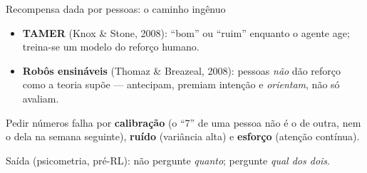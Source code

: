 \documentclass[aspectratio=169, 11pt]{beamer}
\begin{document}
\begin{frame}{Recompensa dada por pessoas: o caminho ingênuo}

  \begin{itemize}\setlength{\itemsep}{0.35ex}
    \item \textbf{TAMER} (Knox \& Stone, 2008): ``bom'' ou ``ruim'' enquanto o
      agente age; treina-se um modelo do reforço humano.
    \item \textbf{Robôs ensináveis} (Thomaz \& Breazeal, 2008): pessoas
      \emph{não} dão reforço como a teoria supõe --- antecipam, premiam
      intenção e \emph{orientam}, não só avaliam.
  \end{itemize}

  \begin{alertabox}
    Pedir números falha por \textbf{calibração} (o ``7'' de uma pessoa não é o
    de outra, nem o dela na semana seguinte), \textbf{ruído} (variância alta) e
    \textbf{esforço} (atenção contínua).
  \end{alertabox}

  \begin{ideiabox}
    Saída (psicometria, pré-RL): não pergunte \emph{quanto}; pergunte
    \emph{qual dos dois}.
  \end{ideiabox}
\end{frame}
\end{document}
